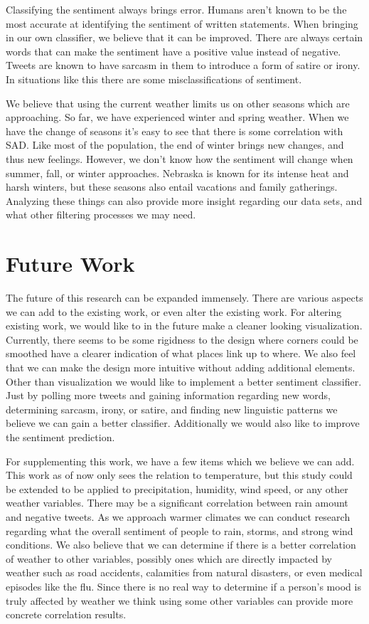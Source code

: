 \documentclass[journal]{vgtc}                %
\begin{document}
Classifying the sentiment always brings error. Humans aren't known to be the most accurate at identifying the sentiment of written statements. \cite{pangthumbs} When bringing in our own classifier, we believe that it can be improved. There are always certain words that can make the sentiment have a positive value instead of negative. Tweets are known to have sarcasm in them to introduce a form of satire or irony. \cite{riloff2013sarcasm} In situations like this there are some misclassifications of sentiment.

We believe that using the current weather limits us on other seasons which are approaching. So far, we have experienced winter and spring weather. When we have the change of seasons it's easy to see that there is some correlation with SAD. Like most of the population, the end of winter brings new changes, and thus new feelings. However, we don't know how the sentiment will change when summer, fall, or winter approaches. Nebraska is known for its intense heat and harsh winters, but these seasons also entail vacations and family gatherings. Analyzing these things can also provide more insight regarding our data sets, and what other filtering processes we may need.

\section{Future Work}

The future of this research can be expanded immensely. There are various aspects we can add to the existing work, or even alter the existing work. For altering existing work, we would like to in the future make a cleaner looking visualization. Currently, there seems to be some rigidness to the design where corners could be smoothed have a clearer indication of what places link up to where. We also feel that we can make the design more intuitive without adding additional elements. Other than visualization we would like to implement a better sentiment classifier. Just by polling more tweets and gaining information regarding new words, determining sarcasm, irony, or satire, and finding new linguistic patterns we believe we can gain a better classifier. Additionally we would also like to improve the sentiment prediction.

For supplementing this work, we have a few items which we believe we can add. This work as of now only sees the relation to temperature, but this study could be extended to be applied to precipitation, humidity, wind speed, or any other weather variables. There may be a significant correlation between rain amount and negative tweets. As we approach warmer climates we can conduct research regarding what the overall sentiment of people to rain, storms, and strong wind conditions. We also believe that we can determine if there is a better correlation of weather to other variables, possibly ones which are directly impacted by weather such as road accidents, calamities from natural disasters, or even medical episodes like the flu. Since there is no real way to determine if a person's mood is truly affected by weather we think using some other variables can provide more concrete correlation results. 
\end{document}
